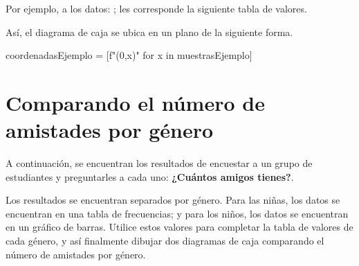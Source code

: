 \documentclass[sin nombre]{plantilla-evaluacion-v1}
\begin{document}

Por ejemplo, a los datos: ; les corresponde la siguiente
tabla de valores. \par

\begin{center}
\end{center}

Así, el diagrama de caja se ubica en un plano de la siguiente forma. \par
\begin{python}
coordenadasEjemplo = [f"(0,{x})" for x in muestrasEjemplo]
\end{python}

\begin{center}
\end{center}

\section*{Comparando el número de amistades por género}

A continuación, se encuentran los resultados de encuestar a un grupo de estudiantes y
preguntarles a cada uno: \textbf{¿Cuántos amigos tienes?}. \par

Los resultados se encuentran separados por género. Para las niñas, los datos se encuentran
en una tabla de frecuencias; y para los niños, los datos se encuentran en un gráfico de barras.
Utilice estos valores para completar la tabla de valores de cada género, y así finalmente
dibujar dos diagramas de caja comparando el número de amistades por género.
\end{document}
